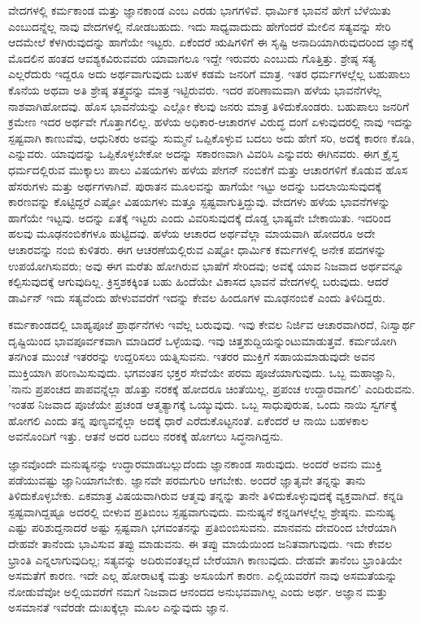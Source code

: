 ವೇದಗಳಲ್ಲಿ ಕರ್ಮಕಾಂಡ ಮತ್ತು ಜ್ಞಾನಕಾಂಡ ಎಂಬ ಎರಡು ಭಾಗಗಳಿವೆ. ಧಾರ್ಮಿಕ ಭಾವನೆ ಹೇಗೆ ಬೆಳೆಯಿತು ಎಂಬುದನ್ನೆಲ್ಲ ನಾವು ವೇದಗಳಲ್ಲಿ ನೋಡಬಹುದು. ಇದು ಸಾಧ್ಯವಾದುದು ಹೇಗೆಂದರೆ ಮೇಲಿನ ಸತ್ಯವನ್ನು ಸೇರಿ ಆದಮೇಲೆ ಕೆಳಗಿರುವುದನ್ನು ಹಾಗೆಯೇ ಇಟ್ಟರು. ಏಕೆಂದರೆ ಋಷಿಗಳಿಗೆ ಈ ಸೃಷ್ಟಿ ಅನಾದಿಯಾಗಿರುವುದರಿಂದ ಜ್ಞಾನಕ್ಕೆ ಮೊದಲಿನ ಹಂತದ ಆವಶ್ಯಕವಿರುವವರು ಯಾವಾಗಲೂ ಇದ್ದೇ ಇರುವರು ಎಂಬುದು ಗೊತ್ತಿತ್ತು. ಶ್ರೇಷ್ಠ ಸತ್ಯ ಎಲ್ಲರೆದುರು ಇದ್ದರೂ ಅದು ಅರ್ಥವಾಗುವುದು ಬಹಳ ಕಡಮೆ ಜನರಿಗೆ ಮಾತ್ರ. ಇತರ ಧರ್ಮಗಳಲ್ಲೆಲ್ಲ ಬಹುಪಾಲು ಕೊನೆಯ ಅಥವಾ ಅತಿ ಶ್ರೇಷ್ಠ ತತ್ತ್ವವನ್ನು ಮಾತ್ರ ಇಟ್ಟಿರುವರು. ಇದರ ಪರಿಣಾಮವಾಗಿ ಹಳೆಯ ಭಾವನೆಗಳೆಲ್ಲ ನಾಶವಾಗಿಹೋದವು. ಹೊಸ ಭಾವನೆಯನ್ನು ಎಲ್ಲೋ ಕೆಲವು ಜನರು ಮಾತ್ರ ತಿಳಿದುಕೊಂಡರು. ಬಹುಪಾಲು ಜನರಿಗೆ ಕ್ರಮೇಣ ಇದರ ಅರ್ಥವೇ ಗೊತ್ತಾಗಲಿಲ್ಲ. ಹಳೆಯ ಅಧಿಕಾರ-ಆಚಾರಗಳ ವಿರುದ್ಧ ದಂಗೆ ಏಳುವುದರಲ್ಲಿ ನಾವು ಇದನ್ನು ಸ್ಪಷ್ಟವಾಗಿ ಕಾಣುವೆವು, ಆಧುನಿಕರು ಅವನ್ನು ಸುಮ್ಮನೆ ಒಪ್ಪಿಕೊಳ್ಳುವ ಬದಲು ಅದು ಹೇಗೆ ಸರಿ, ಅದಕ್ಕೆ ಕಾರಣ ಕೊಡಿ, ಎನ್ನುವರು. ಯಾವುದನ್ನು ಒಪ್ಪಿಕೊಳ್ಳಬೇಕೋ ಅದನ್ನು ಸಕಾರಣವಾಗಿ ವಿವರಿಸಿ ಎನ್ನುವರು ಈಗಿನವರು. ಈಗ ಕ್ರೈಸ್ತ ಧರ್ಮದಲ್ಲಿರುವ ಮುಕ್ಕಾಲು ಪಾಲು ವಿಷಯಗಳು ಹಳೆಯ ಪೇಗನ್ ನಂಬಿಕೆಗೆ ಮತ್ತು ಆಚಾರಗಳಿಗೆ ಕೊಡುವ ಹೊಸ ಹೆಸರುಗಳು ಮತ್ತು ಅರ್ಥಗಳಾಗಿವೆ. ಪುರಾತನ ಮೂಲವನ್ನು ಹಾಗೆಯೇ ಇಟ್ಟು ಅದನ್ನು ಬದಲಾಯಿಸುವುದಕ್ಕೆ ಕಾರಣವನ್ನು ಕೊಟ್ಟಿದ್ದರೆ ಎಷ್ಟೋ ವಿಷಯಗಳು ಮತ್ತೂ ಸ್ಪಷ್ಟವಾಗುತ್ತಿದ್ದುವು. ವೇದಗಳು ಹಳೆಯ ಭಾವನೆಗಳನ್ನು ಹಾಗೆಯೇ ಇಟ್ಟವು. ಅದನ್ನು ಏತಕ್ಕೆ ಇಟ್ಟರು ಎಂದು ವಿವರಿಸುವುದಕ್ಕೆ ದೊಡ್ಡ ಭಾಷ್ಯವೇ ಬೇಕಾಯಿತು. ಇದರಿಂದ ಹಲವು ಮೂಢನಂಬಿಕೆಗಳೂ ಹುಟ್ಟಿದವು. ಹಳೆಯ ಆಚಾರದ ಅರ್ಥವೆಲ್ಲಾ ಮಾಯವಾಗಿ ಹೋದರೂ ಅದೇ ಆಚಾರವನ್ನು ನಂಬಿ ಕುಳಿತರು. ಈಗ ಆಚರಣೆಯಲ್ಲಿರುವ ಎಷ್ಟೋ ಧಾರ್ಮಿಕ ಕರ್ಮಗಳಲ್ಲಿ ಅನೇಕ ಪದಗಳನ್ನು ಉಪಯೋಗಿಸುವರು; ಅವು ಈಗ ಮರೆತು ಹೋಗಿರುವ ಭಾಷೆಗೆ ಸೇರಿದವು; ಅವಕ್ಕೆ ಯಾವ ನಿಜವಾದ ಅರ್ಥವನ್ನೂ ಕಲ್ಪಿಸುವುದಕ್ಕೆ ಆಗುವುದಿಲ್ಲ. ಕ್ರಿಸ್ತಶಕಕ್ಕಿಂತ ಬಹು ಹಿಂದೆಯೇ ವಿಕಾಸದ ಭಾವನೆ ವೇದಗಳಲ್ಲಿ ಬರುವುದು. ಆದರೆ ಡಾರ್ವಿನ್ ಇದು ಸತ್ಯವೆಂದು ಹೇಳುವವರೆಗೆ ಇದನ್ನು ಕೇವಲ ಹಿಂದೂಗಳ ಮೂಢನಂಬಿಕೆ ಎಂದು ತಿಳಿದಿದ್ದರು.

ಕರ್ಮಕಾಂಡದಲ್ಲಿ ಬಾಹ್ಯಪೂಜೆ ಪ್ರಾರ್ಥನೆಗಳು ಇವೆಲ್ಲ ಬರುವುವು. ಇವು ಕೇವಲ ನಿರ್ಜಿವ ಆಚಾರವಾಗಿರದೆ, ನಿಃಸ್ವಾರ್ಥ ದೃಷ್ಟಿಯಿಂದ ಭಾವಪೂರ್ವಕವಾಗಿ ಮಾಡಿದರೆ ಒಳ್ಳೆಯವು. ಇವು ಚಿತ್ತಶುದ್ದಿಯನ್ನುಂಟುಮಾಡುತ್ತವೆ. ಕರ್ಮಯೋಗಿ ತನಗಿಂತ ಮುಂಚೆ ಇತರರನ್ನು ಉದ್ದರಿಸಲು ಯತ್ನಿಸುವನು. ಇತರರ ಮುಕ್ತಿಗೆ ಸಹಾಯಮಾಡುವುದೇ ಅವನ ಮುಕ್ತಿಯಾಗಿ ಪರಿಣಮಿಸುವುದು. ಭಗವಂತನ ಭಕ್ತರ ಸೇವೆಯೇ ಪರಮ ಪೂಜೆಯಾಗುವುದು. ಒಬ್ಬ ಮಹಾಜ್ಞಾನಿ, 'ನಾನು ಪ್ರಪಂಚದ ಪಾಪವನ್ನೆಲ್ಲಾ ಹೊತ್ತು ನರಕಕ್ಕೆ ಹೋದರೂ ಚಿಂತೆಯಿಲ್ಲ, ಪ್ರಪಂಚ ಉದ್ದಾರವಾಗಲಿ' ಎಂದಿರುವನು. ಇಂತಹ ನಿಜವಾದ ಪೂಜೆಯೇ ಪ್ರಚಂಡ ಆತ್ಮತ್ಯಾಗಕ್ಕೆ ಒಯ್ಯುವುದು. ಒಬ್ಬ ಸಾಧುಪುರುಷ, ಒಂದು ನಾಯಿ ಸ್ವರ್ಗಕ್ಕೆ ಹೋಗಲಿ ಎಂದು ತನ್ನ ಪುಣ್ಯವನ್ನೆಲ್ಲಾ ಅದಕ್ಕೆ ಧಾರೆ ಎರೆದುಕೊಟ್ಟನಂತೆ. ಏಕೆಂದರೆ ಆ ನಾಯಿ ಬಹಳಕಾಲ ಅವನೊಂದಿಗೆ ಇತ್ತು. ಆತನೆ ಅದರ ಬದಲು ನರಕಕ್ಕೆ ಹೋಗಲು ಸಿದ್ಧನಾಗಿದ್ದನು.

ಜ್ಞಾನವೊಂದೇ ಮನುಷ್ಯನನ್ನು ಉದ್ಧಾರಮಾಡಬಲ್ಲುದೆಂದು ಜ್ಞಾನಕಾಂಡ ಸಾರುವುದು. ಅಂದರೆ ಅವನು ಮುಕ್ತಿ ಪಡೆಯುವಷ್ಟು ಜ್ಞಾನಿಯಾಗಬೇಕು. ಜ್ಞಾನವೇ ಪರಮಗುರಿ ಆಗಬೇಕು. ಅಂದರೆ ಜ್ಞಾತೃವೇ ತನ್ನನ್ನು ತಾನು ತಿಳಿದುಕೊಳ್ಳಬೇಕು. ಏಕಮಾತ್ರ ವಿಷಯವಾಗಿರುವ ಆತ್ಮವು ತನ್ನನ್ನು ತಾನೇ ತಿಳಿದುಕೊಳ್ಳುವುದಕ್ಕೆ ವ್ಯಕ್ತವಾಗಿದೆ. ಕನ್ನಡಿ ಸ್ಪಷ್ಟವಾಗಿದ್ದಷ್ಟೂ ಅದರಲ್ಲಿ ಬೀಳುವ ಪ್ರತಿಬಿಂಬ ಸ್ಪಷ್ಟವಾಗುವುದು. ಮನುಷ್ಯನೆ ಕನ್ನಡಿಗಳಲ್ಲೆಲ್ಲ ಶ್ರೇಷ್ಠನು. ಮನುಷ್ಯ ಎಷ್ಟು ಪರಿಶುದ್ದನಾದರೆ ಅಷ್ಟು ಸ್ಪಷ್ಟವಾಗಿ ಭಗವಂತನನ್ನು ಪ್ರತಿಬಿಂಬಿಸುವನು. ಮಾನವನು ದೇವರಿಂದ ಬೇರೆಯಾಗಿ ದೇಹವೇ ತಾನೆಂದು ಭಾವಿಸುವ ತಪ್ಪು ಮಾಡುವನು. ಈ ತಪ್ಪು ಮಾಯೆಯಿಂದ ಜನಿತವಾಗುವುದು. ಇದು ಕೇವಲ ಭ್ರಾಂತಿ ಎನ್ನಲಾಗುವುದಿಲ್ಲ; ಸತ್ಯವನ್ನು ಅದಿರುವಂತಲ್ಲದೆ ಬೇರೆಯಾಗಿ ಕಾಣುವುದು. ದೇಹವೇ ತಾನೆಂಬ ಭ್ರಾಂತಿಯೇ ಅಸಮತೆಗೆ ಕಾರಣ. ಇದೇ ಎಲ್ಲ ಹೋರಾಟಕ್ಕೆ ಮತ್ತು ಅಸೂಯೆಗೆ ಕಾರಣ. ಎಲ್ಲಿಯವರೆಗೆ ನಾವು ಅಸಮತೆಯನ್ನು ನೋಡುವೆವೋ ಅಲ್ಲಿಯವರೆಗೆ ನಮಗೆ ನಿಜವಾದ ಆನಂದದ ಅನುಭವವಾಗಿಲ್ಲ ಎಂದು ಅರ್ಥ. ಅಜ್ಞಾನ ಮತ್ತು ಅಸಮಾನತೆ ಇವೆರಡೇ ದುಃಖಕ್ಕೆಲ್ಲಾ ಮೂಲ ಎನ್ನುವುದು ಜ್ಞಾನ.


